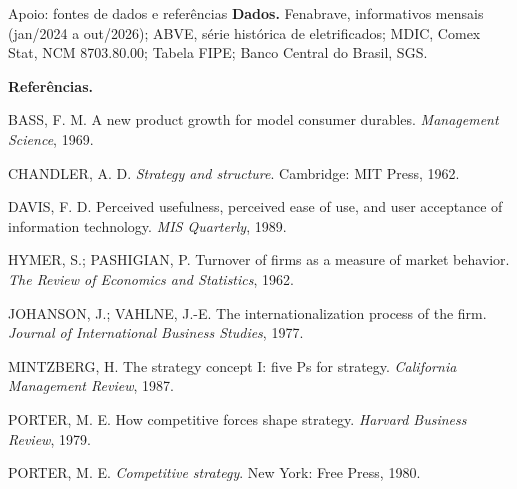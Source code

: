 \documentclass[aspectratio=169,11pt]{beamer}
\begin{document}
\begin{frame}{Apoio: fontes de dados e referências}
\footnotesize
\textbf{Dados.} Fenabrave, informativos mensais (jan/2024 a out/2026); ABVE, série histórica de eletrificados; MDIC, Comex Stat, NCM 8703.80.00; Tabela FIPE; Banco Central do Brasil, SGS.
\vspace{8pt}

\textbf{Referências.}\par
BASS, F. M. A new product growth for model consumer durables. \textit{Management Science}, 1969.\par
CHANDLER, A. D. \textit{Strategy and structure}. Cambridge: MIT Press, 1962.\par
DAVIS, F. D. Perceived usefulness, perceived ease of use, and user acceptance of information technology. \textit{MIS Quarterly}, 1989.\par
HYMER, S.; PASHIGIAN, P. Turnover of firms as a measure of market behavior. \textit{The Review of Economics and Statistics}, 1962.\par
JOHANSON, J.; VAHLNE, J.-E. The internationalization process of the firm. \textit{Journal of International Business Studies}, 1977.\par
MINTZBERG, H. The strategy concept I: five Ps for strategy. \textit{California Management Review}, 1987.\par
PORTER, M. E. How competitive forces shape strategy. \textit{Harvard Business Review}, 1979.\par
PORTER, M. E. \textit{Competitive strategy}. New York: Free Press, 1980.
\end{frame}
\end{document}

